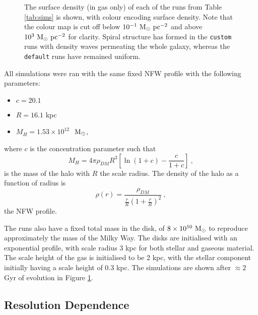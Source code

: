 \begin{figure}[!ht]
    \leavevmode\rlap{\usebox{\graphicsbox}}%
    \begin{minipage}[b]{0.63\wd\graphicsbox}%
        \caption{The surface density (in gas only) of each of the runs from Table \ref{tab:sims} is shown, with colour encoding surface density. Note that the colour map is cut off below $10^{-1} ~\mathrm{M}_{\odot} ~\mathrm{pc}^{-2}$ and above $10^3 ~\mathrm{M}_{\odot} ~\mathrm{pc}^{-2}$ for clarity. Spiral structure has formed in the {\tt custom} runs with density waves permeating the whole galaxy, whereas the {\tt default} runs have remained uniform.}
        \label{fig:sdbig}
    \end{minipage}\hspace*{0.33\wd\graphicsbox}%
\end{figure}

All simulations were ran with the same fixed NFW profile with the following parameters:
\begin{itemize}
    \item $c = 20.1$
    \item $R = 16.1$ kpc
    \item $M_{H} = 1.53 \times 10^{12}$ $~\mathrm{M}_{\odot}$,
\end{itemize}
where $c$ is the concentration parameter such that
$$
    M_{H} = 4\pi \rho_{DM} R^3 \left[ \ln (1 + c) - \frac{c}{1+c} \right]~,
$$
is the mass of the halo with $R$ the scale radius.
The density of the halo as a function of radius is 
\begin{equation}
    \rho(r) = \frac{\rho_{DM}}{\frac{r}{R} \left( 1 + \frac{r}{R} \right)^2}~,
    \label{eqn:nfw}
\end{equation}
the NFW profile.

The runs also have a fixed total mass in the disk, of $8\times10^{10} ~\mathrm{M}_{\odot}$ to reproduce approximately the mass of the Milky Way.
The disks are initialised with an exponential profile, with scale radius $3$ kpc for both stellar and gaseous material.
The scale height of the gas is initialised to be 2 kpc, with the stellar component initially having a scale height of 0.3 kpc.
The simulations are shown after $\approx 2$ Gyr of evolution in Figure \ref{fig:sdbig}. 

\subsection{Resolution Dependence}

